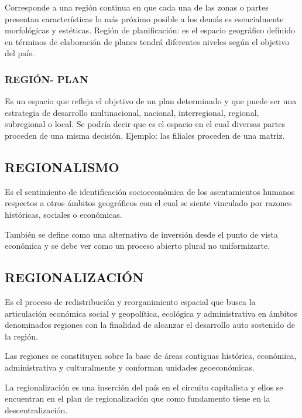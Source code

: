 \documentclass[
  a4paper,
]{article}
\begin{document}
Corresponde a una región continua en que cada una de las zonas o partes
presentan características lo más próximo posible a los demás es
esencialmente morfológicas y estéticas. Región de planificación: es el
espacio geográfico definido en términos de elaboración de planes tendrá
diferentes niveles según el objetivo del país.

\hypertarget{regiuxf3n--plan}{%
\subsubsection{REGIÓN- PLAN}\label{regiuxf3n--plan}}

Es un espacio que refleja el objetivo de un plan determinado y que puede
ser una estrategia de desarrollo multinacional, nacional, interregional,
regional, subregional o local. Se podría decir que es el espacio en el
cual diversas partes proceden de una misma decisión. Ejemplo: las
filiales proceden de una matriz.

\hypertarget{regionalismo}{%
\subsection{REGIONALISMO}\label{regionalismo}}

Es el sentimiento de identificación socioeconómica de los asentamientos
humanos respectos a otros ámbitos geográficos con el cual se siente
vinculado por razones históricas, sociales o económicas.

También se define como una alternativa de inversión desde el punto de
vista económica y se debe ver como un proceso abierto plural no
uniformizarte.

\hypertarget{regionalizaciuxf3n}{%
\subsection{REGIONALIZACIÓN}\label{regionalizaciuxf3n}}

Es el proceso de redistribución y reorganimiento espacial que busca la
articulación económica social y geopolítica, ecológica y administrativa
en ámbitos denominados regiones con la finalidad de alcanzar el
desarrollo auto sostenido de la región.

Las regiones se constituyen sobre la base de áreas contiguas histórica,
económica, administrativa y culturalmente y conforman unidades
geoeconómicas.

La regionalización es una inserción del país en el circuito capitalista
y ellos se encuentran en el plan de regionalización que como fundamento
tiene en la descentralización.
\end{document}
